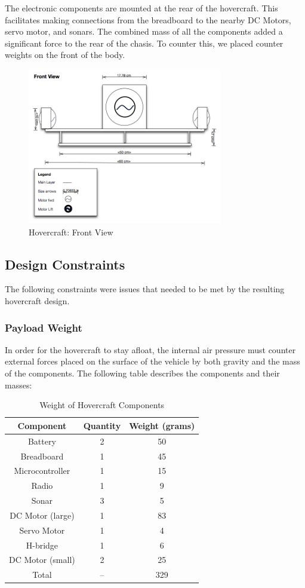 The electronic components are mounted at the rear of the hovercraft. This facilitates making connections from the breadboard to the nearby DC Motors, servo motor, and sonars. The combined mass of all the components added a significant force to the rear of the chasis. To counter this, we placed counter weights on the front of the body.

\begin{figure}[h]
  \begin{center}
    \includegraphics[width=85mm]{imageSources/frontView.png}
  \end{center}
  \caption{Hovercraft: Front View} 
  \label{frontView}
\end{figure}

\subsection{Design Constraints}
The following constraints were issues that needed to be met by the resulting hovercraft design.

\subsubsection{Payload Weight}
In order for the hovercraft to stay afloat, the internal air pressure must counter external forces placed on the surface of the vehicle by both gravity and the mass of the components. The following table describes the components and their masses:

\begin{table}
\caption{Weight of Hovercraft Components}
\begin{center}
\begin{tabular}{ c c c}
  Component & Quantity & Weight (grams) \\
  \hline
	Battery  &	2 & 	50 \\
	Breadboard &	1 &	45 \\
	Microcontroller &	1 &	15 \\
	Radio &	1 &	9 \\
	Sonar &	3 &	5 \\
	DC Motor (large) &	1 &	83 \\
	Servo Motor &	1 &	4 \\
	H-bridge &	1 &	6 \\
	DC Motor (small) &	2 &	25 \\
	Total &	-- &	329 \\
\end{tabular}
\end{center}
\label{restingTable}
\end{table}

